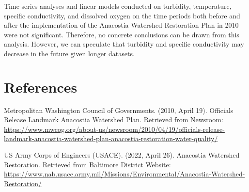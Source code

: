 \documentclass[
  12pt,
]{article}
\begin{document}
Time series analyses and linear models conducted on turbidity,
temperature, specific conductivity, and dissolved oxygen on the time
periods both before and after the implementation of the Anacostia
Watershed Restoration Plan in 2010 were not significant. Therefore, no
concrete conclusions can be drawn from this analysis. However, we can
speculate that turbidity and specific conductivity may decrease in the
future given longer datasets.

\newpage

\hypertarget{references}{%
\section{References}\label{references}}

Metropolitan Washington Council of Governments. (2010, April 19).
Officials Release Landmark Anacostia Watershed Plan. Retrieved from
Newsroom:
\url{https://www.mwcog.org/about-us/newsroom/2010/04/19/officials-release-landmark-anacostia-watershed-plan-anacostia-restoration-water-quality/}

US Army Corps of Engineers (USACE). (2022, April 26). Anacostia
Watershed Restoration. Retrieved from Baltimore District Website:
\url{https://www.nab.usace.army.mil/Missions/Environmental/Anacostia-Watershed-Restoration/}
\end{document}
